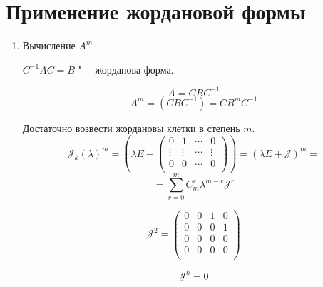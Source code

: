 \section{Применение жордановой формы}
\begin{enumerate}
\item Вычисление $A^{m}$

$C^{-1}AC = B$ "--- жорданова форма.

$$A = CBC^{-1}$$
$$A^{m} = (CBC^{-1}) = CB^{m}C^{-1}$$

Достаточно возвести жордановы клетки в степень $m$.
$$\mathcal{J}_k(\lambda)^m = (\lambda E + 
\begin{pmatrix}
0&1&\cdots&0\\
\vdots&\vdots&\cdots&\vdots\\
0&0&\cdots&0\\
\end{pmatrix}) = (\lambda E + \mathcal{J})^m = $$
$$= \sum_{r = 0}^{m}C_m^{r}\lambda^{m - r}\mathcal{J}^r$$

$$ 
\mathcal{J}^2 = \begin{pmatrix}
0&0&1&0\\
0&0&0&1\\
0&0&0&0\\
0&0&0&0\\
\end{pmatrix}
$$

$$\mathcal{J}^k = 0$$


\end{enumerate}
